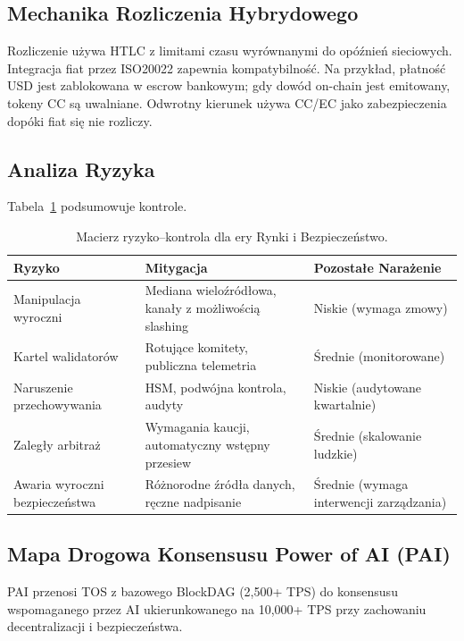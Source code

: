 \documentclass[11pt]{article}
\begin{document}
\subsection{Mechanika Rozliczenia Hybrydowego}
Rozliczenie używa HTLC z limitami czasu wyrównanymi do opóźnień sieciowych. Integracja fiat przez ISO20022 zapewnia kompatybilność. Na przykład, płatność USD jest zablokowana w escrow bankowym; gdy dowód on-chain jest emitowany, tokeny CC są uwalniane. Odwrotny kierunek używa CC/EC jako zabezpieczenia dopóki fiat się nie rozliczy.

\subsection{Analiza Ryzyka}
Tabela~\ref{tab:risk-markets} podsumowuje kontrole.

\begin{table}[H]
  \centering
  \begin{tabular}{p{}p{}p{}}
    \toprule
    \textbf{Ryzyko} & \textbf{Mitygacja} & \textbf{Pozostałe Narażenie} \\
    \midrule
    Manipulacja wyroczni & Mediana wieloźródłowa, kanały z możliwością slashing & Niskie (wymaga zmowy) \\
    Kartel walidatorów & Rotujące komitety, publiczna telemetria & Średnie (monitorowane) \\
    Naruszenie przechowywania & HSM, podwójna kontrola, audyty & Niskie (audytowane kwartalnie) \\
    Zaległy arbitraż & Wymagania kaucji, automatyczny wstępny przesiew & Średnie (skalowanie ludzkie) \\
    Awaria wyroczni bezpieczeństwa & Różnorodne źródła danych, ręczne nadpisanie & Średnie (wymaga interwencji zarządzania) \\
    \bottomrule
  \end{tabular}
  \caption{Macierz ryzyko--kontrola dla ery Rynki i Bezpieczeństwo.}
  \label{tab:risk-markets}
\end{table}

\subsection{Mapa Drogowa Konsensusu Power of AI (PAI)}
\label{sec:pai-roadmap}
PAI przenosi TOS z bazowego BlockDAG (2,500+ TPS) do konsensusu wspomaganego przez AI ukierunkowanego na 10,000+ TPS przy zachowaniu decentralizacji i bezpieczeństwa.
\end{document}
